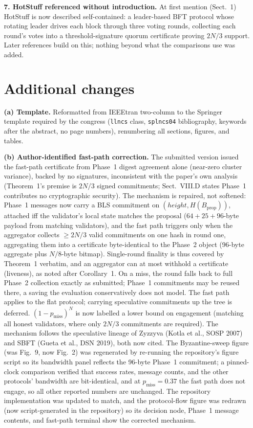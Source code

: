 \documentclass[10pt]{article}
\begin{document}
\textbf{7. HotStuff referenced without introduction.} At first mention
(Sect.~1) HotStuff is now described self-contained: a leader-based BFT
protocol whose rotating leader drives each block through three voting
rounds, collecting each round's votes into a threshold-signature quorum
certificate proving $2N/3$ support. Later references build on this; nothing
beyond what the comparisons use was added.

\section*{Additional changes}

\textbf{(a) Template.} Reformatted from IEEEtran two-column to the Springer
template required by the congress (\texttt{llncs} class, \texttt{splncs04}
bibliography, keywords after the abstract, no page numbers), renumbering
all sections, figures, and tables.

\textbf{(b) Author-identified fast-path correction.} The submitted version
issued the fast-path certificate from Phase~1 digest agreement alone
(near-zero cluster variance), backed by no signatures, inconsistent with
the paper's own analysis (Theorem~1's premise is $2N/3$ signed commitments;
Sect.~VIII.D states Phase~1 contributes no cryptographic security). The
mechanism is repaired, not softened: Phase~1 messages now carry a BLS
commitment on $(\mathit{height}, H(B_{\mathrm{prop}}))$, attached iff the
validator's local state matches the proposal ($64{+}25{+}96$-byte payload
from matching validators), and the fast path triggers only when the
aggregator collects ${\ge}2N/3$ valid commitments on one hash in round one,
aggregating them into a certificate byte-identical to the Phase~2 object
(96-byte aggregate plus $N/8$-byte bitmap). Single-round finality is thus
covered by Theorem~1 verbatim, and an aggregator can at most withhold a
certificate (liveness), as noted after Corollary~1. On a miss, the round
falls back to full Phase~2 collection exactly as submitted; Phase~1
commitments may be reused there, a saving the evaluation conservatively
does not model. The fast path applies to the flat protocol; carrying
speculative commitments up the tree is deferred.
$(1-p_{\mathrm{miss}})^N$ is now labelled a lower bound on engagement
(matching all honest validators, where only $2N/3$ commitments are
required). The mechanism follows the speculative lineage of Zyzzyva (Kotla
et al., SOSP 2007) and SBFT (Gueta et al., DSN 2019), both now cited. The
Byzantine-sweep figure (was Fig.~9, now Fig.~2) was regenerated by
re-running the repository's figure script so its bandwidth panel reflects
the 96-byte Phase~1 commitment; a pinned-clock comparison verified that
success rates, message counts, and the other protocols' bandwidth are
bit-identical, and at $p_{\mathrm{miss}}{=}0.37$ the fast path does not
engage, so all other reported numbers are unchanged. The repository
implementation was updated to match, and the protocol-flow figure was
redrawn (now script-generated in the repository) so its decision node,
Phase~1 message contents, and fast-path terminal show the corrected
mechanism.
\end{document}
